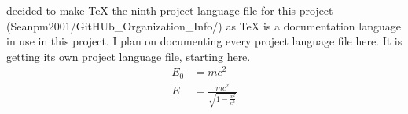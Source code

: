 \documentclass{article} %
\title{\ProjectLanguageFileNine} %
\begin{document}
  \maketitle
  \I decided to make TeX the ninth project language file for this project (Seanpm2001/GitHUb_Organization_Info/) as TeX is a documentation language in use in this project. I plan on documenting every project language file here. It is getting its own project language file, starting here.
  \begin{align}
    E_0 &= mc^2 \\
    E &= \frac{mc^2}{\sqrt{1-\frac{v^2}{c^2}}}
  \end{align} 
\end{document}

